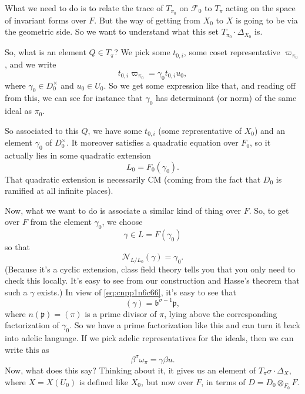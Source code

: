 \documentclass[reqno]{amsart} 
\begin{document}
What we need to do is to relate the trace of $T_{\pi_0}$ on $\mathcal{F}_0$ to $T_{\pi}$ acting on the space of invariant forms over $F$.  But the way of getting from $X_0$ to $X$ is going to be via the geometric side.  So we want to understand what this set $T_{\pi_0} \cdot \Delta_{X_0}$ is.

So, what is an element $Q \in T_{\pi}$?  We pick some $t_{0, i}$, some coset representative $\varpi_{\pi_0}$, and we write 
\begin{equation*}
  t_{0, i} \varpi_{\pi_0 } = \gamma_0 t_{0, i} u_0,
\end{equation*}
where $\gamma_0 \in D_0^\times$ and $u_0 \in U_0$.  So we get some expression like that, and reading off from this, we can see for instance that $\gamma_0$ has determinant (or norm) of the same ideal as $\pi_0$.

So associated to this $Q$, we have some $t_{0, i}$ (some representative of $X_0$) and an element $\gamma_0$ of $D_0^\times$.  It moreover satisfies a quadratic equation over $F_0$, so it actually lies in some quadratic extension
\begin{equation*}
  L_0 = F_0(\gamma_0).
\end{equation*}
That quadratic extension is necessarily CM (coming from the fact that $D_0$ is ramified at all infinite places).

Now, what we want to do is associate a similar kind of thing over $F$.  So, to get over $F$ from the element $\gamma_0$, we choose
\begin{equation*}
  \gamma \in L = F(\gamma_0)
\end{equation*}
so that
\begin{equation}\label{eq:cnpp1n6c66}
  \mathcal{N}_{L / L_0}(\gamma) = \gamma_0.
\end{equation}
(Because it's a cyclic extension, class field theory tells you that you only need to check this locally.  It's easy to see from our construction and Hasse's theorem that such a $\gamma$ exists.)  In view of \eqref{eq:cnpp1n6c66}, it's easy to see that
\begin{equation*}
  (\gamma) = \mathfrak{b}^{\sigma - 1} \mathfrak{p},
\end{equation*}
where $n(\mathfrak{p}) =(\pi)$ is a prime divisor of $\pi$, lying above the corresponding factorization of $\gamma_0$.  So we have a prime factorization like this and can turn it back into adelic language.  If we pick adelic representatives for the ideals, then we can write this as
\begin{equation*}
  \beta^\sigma \omega_{\pi} = \gamma \beta u.
\end{equation*}
Now, what does this say?  Thinking about it, it gives us an element of $T_\pi \sigma \cdot \Delta_X$, where $X = X(U_0)$ is defined like $X_0$, but now over $F$, in terms of $D = D_0 \otimes_{F_0} F$.
\end{document}
